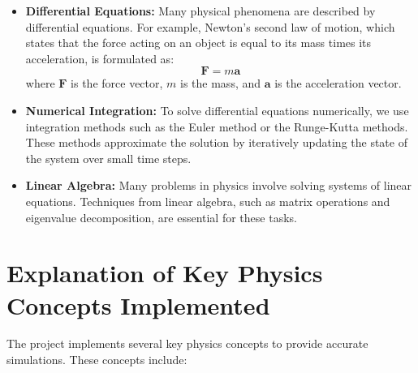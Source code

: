 \begin{itemize}
    \item \textbf{Differential Equations:} Many physical phenomena are described by differential equations. For example, Newton's second law of motion, which states that the force acting on an object is equal to its mass times its acceleration, is formulated as:
    \begin{equation}
        \mathbf{F} = m \mathbf{a}
    \end{equation}
    where \(\mathbf{F}\) is the force vector, \(m\) is the mass, and \(\mathbf{a}\) is the acceleration vector.
    \item \textbf{Numerical Integration:} To solve differential equations numerically, we use integration methods such as the Euler method or the Runge-Kutta methods. These methods approximate the solution by iteratively updating the state of the system over small time steps.
    \item \textbf{Linear Algebra:} Many problems in physics involve solving systems of linear equations. Techniques from linear algebra, such as matrix operations and eigenvalue decomposition, are essential for these tasks.
\end{itemize}

\section{Explanation of Key Physics Concepts Implemented}

The project implements several key physics concepts to provide accurate simulations. These concepts include:

